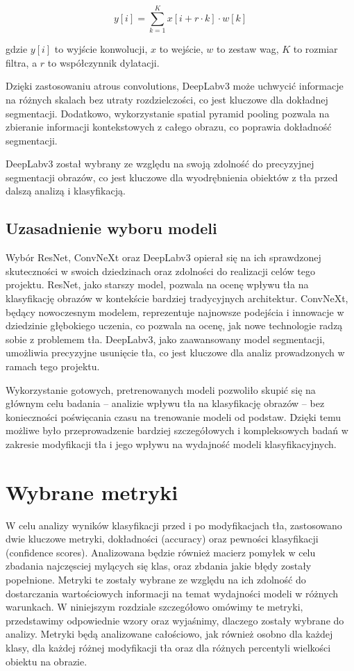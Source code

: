 \begin{equation}
y[i] = \sum_{k=1}^{K} x[i + r \cdot k] \cdot w[k]
\end{equation}

gdzie \( y[i] \) to wyjście konwolucji, \( x \) to wejście, \( w \) to zestaw wag, \( K \) to rozmiar filtra, a \( r \) 
to współczynnik dylatacji.

Dzięki zastosowaniu atrous convolutions, DeepLabv3 może uchwycić informacje na różnych skalach bez utraty 
rozdzielczości, co jest kluczowe dla dokładnej segmentacji. Dodatkowo, wykorzystanie spatial pyramid pooling pozwala na 
zbieranie informacji kontekstowych z całego obrazu, co poprawia dokładność segmentacji.

DeepLabv3 został wybrany ze względu na swoją zdolność do precyzyjnej segmentacji obrazów, co jest kluczowe dla 
wyodrębnienia obiektów z tła przed dalszą analizą i klasyfikacją.

\subsection*{Uzasadnienie wyboru modeli}

Wybór ResNet, ConvNeXt oraz DeepLabv3 opierał się na ich sprawdzonej skuteczności w swoich dziedzinach oraz zdolności 
do realizacji celów tego projektu. ResNet, jako starszy model, pozwala na ocenę wpływu tła na klasyfikację obrazów w 
kontekście bardziej tradycyjnych architektur. ConvNeXt, będący nowoczesnym modelem, reprezentuje najnowsze podejścia i 
innowacje w dziedzinie głębokiego uczenia, co pozwala na ocenę, jak nowe technologie radzą sobie z problemem tła. 
DeepLabv3, jako zaawansowany model segmentacji, umożliwia precyzyjne usunięcie tła, co jest kluczowe dla analiz 
prowadzonych w ramach tego projektu.

Wykorzystanie gotowych, pretrenowanych modeli pozwoliło skupić się na głównym celu badania – analizie wpływu tła na 
klasyfikację obrazów – bez konieczności poświęcania czasu na trenowanie modeli od podstaw. Dzięki temu możliwe było 
przeprowadzenie bardziej szczegółowych i kompleksowych badań w zakresie modyfikacji tła i jego wpływu na wydajność 
modeli klasyfikacyjnych.

\section*{Wybrane metryki}

W celu analizy wyników klasyfikacji przed i po modyfikacjach tła, zastosowano dwie kluczowe metryki, dokładności 
(accuracy) oraz pewności klasyfikacji (confidence scores). Analizowana będzie również macierz pomyłek w celu zbadania
najczęsciej mylących się klas, oraz zbdania jakie błędy zostały popełnione. Metryki te zostały wybrane ze względu na ich zdolność do 
dostarczania wartościowych informacji na temat wydajności modeli w różnych warunkach. W niniejszym rozdziale szczegółowo 
omówimy te metryki, przedstawimy odpowiednie wzory oraz wyjaśnimy, dlaczego zostały wybrane do analizy. Metryki będą 
analizowane całościowo, jak również osobno dla każdej klasy, dla każdej różnej modyfikacji tła oraz dla różnych 
percentyli wielkości obiektu na obrazie.

